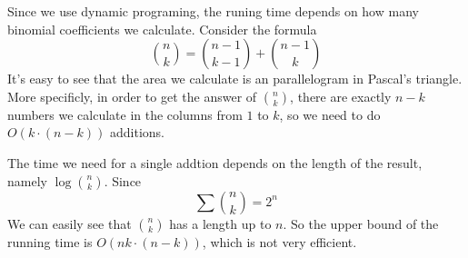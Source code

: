 Since we use dynamic programing, the runing time depends on how many binomial coefficients we calculate.
Consider the formula
\[\binom{n}{k}=\binom{n-1}{k-1}+\binom{n-1}{k}\]
It's easy to see that the area we calculate is an parallelogram in Pascal's triangle.
More specificly, in order to get the answer of $\binom{n}{k}$, there are exactly $n-k$ numbers we calculate in the columns from $1$ to $k$,
so we need to do $O(k\cdot (n-k))$ additions.\par
The time we need for a single addtion depends on the length of the result, namely $\log \binom{n}{k}$.
Since
\[\sum \binom{n}{k}=2^n\]
We can easily see that $\binom{n}{k}$ has a length up to $n$.
So the upper bound of the running time is $O(nk\cdot (n-k))$, which is not very efficient.
